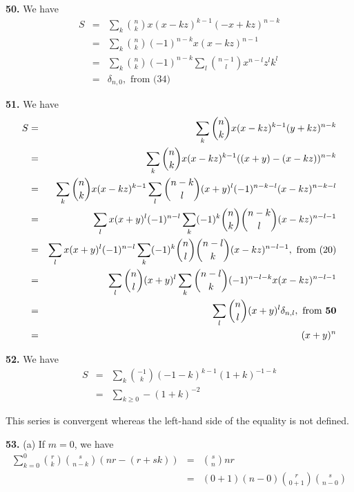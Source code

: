 \documentclass[a4paper,12pt]{article}
\newcommand{\newpar}[1]{\bigskip \noindent \textbf{#1.}}
\newcommand{\subpar}[1]{\medskip \noindent (#1)}
\begin{document}
\newpar{50} We have
\begin{eqnarray*}
  S &=&  \sum_k {n \choose k} x(x-kz)^{k-1}(-x + kz)^{n-k} \\
  &=& \sum_k {n
    \choose k} (-1)^{n-k} x (x - kz)^{n-1} \\
  &=& \sum_k {n \choose k} (-1)^{n-k} \sum_l {n-1 \choose l}
  x^{n-l}z^l k^l \\
  &=& \delta_{n,0}, \mbox{ from (34)}
\end{eqnarray*}

\newpar{51} We have
\begin{eqnarray*}
 S &=&  \sum_k {n \choose k} x (x-kz)^{k-1}(y+kz)^{n-k} \\
 &=&  \sum_k {n \choose k} x (x-kz)^{k-1}((x+y) - (x-kz))^{n-k} \\
 &=& \sum_k {n \choose k} x(x-kz)^{k-1} \sum_l {n-k \choose l} (x+y)^l
 (-1)^{n-k-l}(x-kz)^{n-k-l} \\
 &=& \sum_l x (x+y)^l (-1)^{n-l} \sum_k (-1)^k {n \choose k}{n - k
   \choose l}(x - kz)^{n-l-1} \\
 &=& \sum_l x (x+y)^l (-1)^{n-l} \sum_k (-1)^k {n \choose l}{n-l
   \choose k} (x-kz)^{n-l-1}, \mbox{ from (20)} \\
 &=& \sum_l {n \choose l}(x+y)^l \sum_k {n-l \choose k}(-1)^{n-l-k} x(x -
 kz)^{n-l-1} \\
 &=& \sum_l {n \choose l}(x+y)^l \delta_{n,l}, \mbox{ from \textbf{50}} \\
 &=& (x+y)^n
\end{eqnarray*}

\newpar{52} We have
\begin{eqnarray*}
  S &=& \sum_k {-1 \choose k}(-1-k)^{k-1}(1+k)^{-1-k} \\
  &=& \sum_{k\ge 0} - (1+k)^{-2}
\end{eqnarray*}

This series is convergent whereas the left-hand side of the equality
is not defined.

\newpar{53} \subpar{a} If $m=0$, we have
\begin{eqnarray*}
  \sum_{k=0}^0 {r \choose k} {s \choose n-k} (nr-(r+sk)) &=& {s
    \choose n}nr \\
  &=& (0+1)(n-0) {r \choose 0+1}{s \choose n-0}
\end{eqnarray*}
\end{document}
